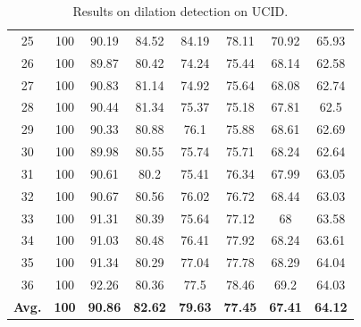 \documentclass[review]{elsarticle}
\begin{document}
\begin{table}[ht!]
\begin{minipage}{0.48\linewidth}
{\begin{tabular}{c|ccccccc}
				25&100&90.19&84.52&84.19&78.11&70.92&65.93\\
				26&100&89.87&80.42&74.24&75.44&68.14&62.58\\
				27&100&90.83&81.14&74.92&75.64&68.08&62.74\\
				28&100&90.44&81.34&75.37&75.18&67.81&62.5\\
				29&100&90.33&80.88&76.1&75.88&68.61&62.69\\
				30&100&89.98&80.55&75.74&75.71&68.24&62.64\\
				31&100&90.61&80.2&75.41&76.34&67.99&63.05\\
				32&100&90.67&80.56&76.02&76.72&68.44&63.03\\
				33&100&91.31&80.39&75.64&77.12&68&63.58\\
				34&100&91.03&80.48&76.41&77.92&68.24&63.61\\
				35&100&91.34&80.29&77.04&77.78&68.29&64.04\\
				36&100&92.26&80.36&77.5&78.46&69.2&64.03\\
				\hline
				\textbf{Avg.}&\textbf{100}&\textbf{90.86}&\textbf{82.62}&\textbf{79.63}&\textbf{77.45}&\textbf{67.41}&\textbf{64.12}\\
				\hline\hline	
		\end{tabular}}
	\end{minipage}
	\begin{minipage}{0.48\linewidth}
		\centering
		\caption{Results on dilation detection on UCID.}
		\label{table:uciddilation}
\end{minipage}
\end{table}
\end{document}
